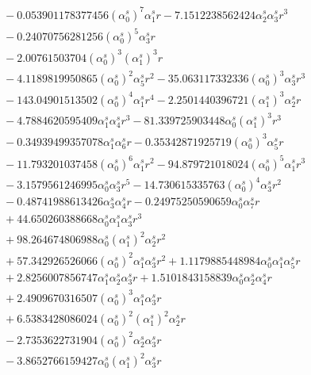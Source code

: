 \documentclass[10pt]{article}
\begin{document}
\begin{align*}
&{}  - 0.053901178377456 \left(\alpha_{0}^s\right)^{7} \alpha_{1}^s r - 7.1512238562424 \alpha_{2}^s \alpha_{3}^s r^{3} \\
&{}  - 0.24070756281256 \left(\alpha_{0}^s\right)^{5} \alpha_{3}^s r \\
&{}  - 2.00761503704 \left(\alpha_{0}^s\right)^{3} \left(\alpha_{1}^s\right)^{3} r \\
&{}  - 4.1189819950865 \left(\alpha_{0}^s\right)^{2} \alpha_{5}^s r^{2} - 35.063117332336 \left(\alpha_{0}^s\right)^{3} \alpha_{3}^s r^{3} \\
&{}  - 143.04901513502 \left(\alpha_{0}^s\right)^{4} \alpha_{1}^s r^{4} - 2.2501440396721 \left(\alpha_{1}^s\right)^{3} \alpha_{2}^s r \\
&{}  - 4.7884620595409 \alpha_{1}^s \alpha_{4}^s r^{3} - 81.339725903448 \alpha_{0}^s \left(\alpha_{1}^s\right)^{3} r^{3} \\
&{}  - 0.34939499357078 \alpha_{1}^s \alpha_{6}^s r - 0.35342871925719 \left(\alpha_{0}^s\right)^{3} \alpha_{5}^s r \\
&{}  - 11.793201037458 \left(\alpha_{0}^s\right)^{6} \alpha_{1}^s r^{2} - 94.879721018024 \left(\alpha_{0}^s\right)^{5} \alpha_{1}^s r^{3} \\
&{}  - 3.1579561246995 \alpha_{0}^s \alpha_{3}^s r^{5} - 14.730615335763 \left(\alpha_{0}^s\right)^{4} \alpha_{3}^s r^{2} \\
&{}  - 0.48741988613426 \alpha_{3}^s \alpha_{4}^s r - 0.24975250590659 \alpha_{0}^s \alpha_{7}^s r \\
&{}  + 44.650260388668 \alpha_{0}^s \alpha_{1}^s \alpha_{3}^s r^{3} \\
&{}  + 98.264674806988 \alpha_{0}^s \left(\alpha_{1}^s\right)^{2} \alpha_{2}^s r^{2} \\
&{}  + 57.342926526066 \left(\alpha_{0}^s\right)^{2} \alpha_{1}^s \alpha_{3}^s r^{2} + 1.1179885448984 \alpha_{0}^s \alpha_{1}^s \alpha_{5}^s r \\
&{}  + 2.8256007856747 \alpha_{1}^s \alpha_{2}^s \alpha_{3}^s r + 1.5101843158839 \alpha_{0}^s \alpha_{2}^s \alpha_{4}^s r \\
&{}  + 2.4909670316507 \left(\alpha_{0}^s\right)^{3} \alpha_{1}^s \alpha_{3}^s r \\
&{}  + 6.5383428086024 \left(\alpha_{0}^s\right)^{2} \left(\alpha_{1}^s\right)^{2} \alpha_{2}^s r \\
&{}  - 2.7353622731904 \left(\alpha_{0}^s\right)^{2} \alpha_{2}^s \alpha_{3}^s r \\
&{}  - 3.8652766159427 \alpha_{0}^s \left(\alpha_{1}^s\right)^{2} \alpha_{3}^s r \\

\end{align*}
\end{document}
